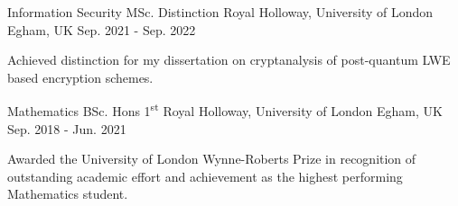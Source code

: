 


\begin{cventries}

\cventry
{Information Security MSc. Distinction} %
{Royal Holloway, University of London} %
{Egham, UK} %
{Sep. 2021 - Sep. 2022} %
{ %
\begin{cvitems}
\item {Achieved distinction for my dissertation on cryptanalysis of post-quantum LWE based encryption schemes.}
\end{cvitems}
}

\cventry
{Mathematics BSc. Hons 1\textsuperscript{st}} %
{Royal Holloway, University of London} %
{Egham, UK} %
{Sep. 2018 - Jun. 2021} %
{ %
\begin{cvitems}
\item {Awarded the University of London Wynne-Roberts Prize in recognition of outstanding academic effort and achievement as the highest performing Mathematics student.}
\end{cvitems}
}




\end{cventries}